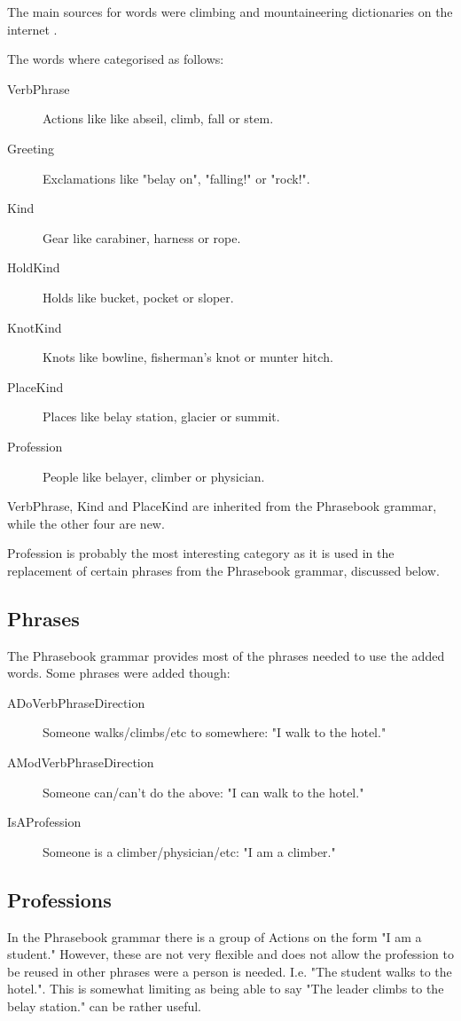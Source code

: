 The main sources for words were climbing and mountaineering dictionaries on the internet \cite{dict1} \cite{dict2} \cite{dict3}.

The words where categorised as follows:
\begin{description}
\item[VerbPhrase] Actions like like abseil, climb, fall or stem.
\item[Greeting] Exclamations like "belay on", "falling!" or "rock!".
\item[Kind] Gear like carabiner, harness or rope.
\item[HoldKind] Holds like bucket, pocket or sloper.
\item[KnotKind] Knots like bowline, fisherman's knot or munter hitch.
\item[PlaceKind] Places like belay station, glacier or summit.
\item[Profession] People like belayer, climber or physician.
\end{description}
VerbPhrase, Kind and PlaceKind are inherited from the Phrasebook grammar, while the other four are new.

Profession is probably the most interesting category as it is used in the replacement of certain phrases from the Phrasebook grammar, discussed below.


\subsection{Phrases}
The Phrasebook grammar provides most of the phrases needed to use the added words. Some phrases were added though:
\begin{description}
\item[ADoVerbPhraseDirection] Someone walks/climbs/etc to somewhere: "I walk to the hotel."
\item[AModVerbPhraseDirection] Someone can/can't do the above: "I can walk to the hotel."
\item[IsAProfession] Someone is a climber/physician/etc: "I am a climber."
\end{description}


\subsection{Professions}
In the Phrasebook grammar there is a group of Actions on the form "I am a student." However, these are not very flexible and does not allow the profession to be reused in other phrases were a person is needed. I.e. "The student walks to the hotel.".
This is somewhat limiting as being able to say "The leader climbs to the belay station." can be rather useful.

